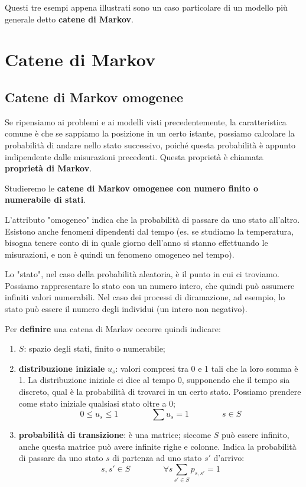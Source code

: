 \documentclass[a4paper,12pt]{book}
\begin{document}
Questi tre esempi appena illustrati sono un caso particolare di un modello più generale detto \textbf{catene di Markov}. 

\chapter{Catene di Markov}
\section{Catene di Markov omogenee}
Se ripensiamo ai problemi e ai modelli visti precedentemente, la caratteristica comune è che se sappiamo la posizione in un certo istante, possiamo calcolare la probabilità di andare nello stato successivo, poiché questa probabilità è appunto indipendente dalle misurazioni precedenti. Questa proprietà è chiamata \textbf{proprietà di Markov}.

Studieremo le \textbf{catene di Markov omogenee con numero finito o numerabile di stati}.

L'attributo "omogeneo" indica che la probabilità di passare da uno stato all'altro. Esistono anche fenomeni dipendenti dal tempo (es. se studiamo la temperatura, bisogna tenere conto di in quale giorno dell'anno si stanno effettuando le misurazioni, e non è quindi un fenomeno omogeneo nel tempo).

Lo "stato", nel caso della probabilità aleatoria, è il punto in cui ci troviamo. Possiamo rappresentare lo stato con un numero intero, che quindi può assumere infiniti valori numerabili. Nel caso dei processi di diramazione, ad esempio, lo stato può essere il numero degli individui (un intero non negativo). 

Per \textbf{definire} una catena di Markov occorre quindi indicare:
\begin{enumerate}
	\item $S$: spazio degli stati, finito o numerabile;
	\item \textbf{distribuzione iniziale} $ u_s $: valori compresi tra 0 e 1 tali che la loro somma è 1. La distribuzione iniziale ci dice al tempo 0, supponendo che il tempo sia discreto, qual è la probabilità di trovarci in un certo stato. Possiamo prendere come stato iniziale qualsiasi stato oltre a 0;
	$$ 0 \le u_s \le 1 \qquad \qquad \sum u_s  = 1 \qquad \qquad s \in S $$
	\item \textbf{probabilità di transizione}: è una matrice; siccome $ S $ può essere infinito, anche questa matrice può avere infinite righe e colonne. Indica la probabilità di passare da uno stato $ s $ di partenza ad uno stato $ s' $ d'arrivo:
	$$ s, s' \in S \qquad \qquad \forall s \sum_{s'\in S} p_{s,s'} = 1 $$
\end{enumerate}
\end{document}
